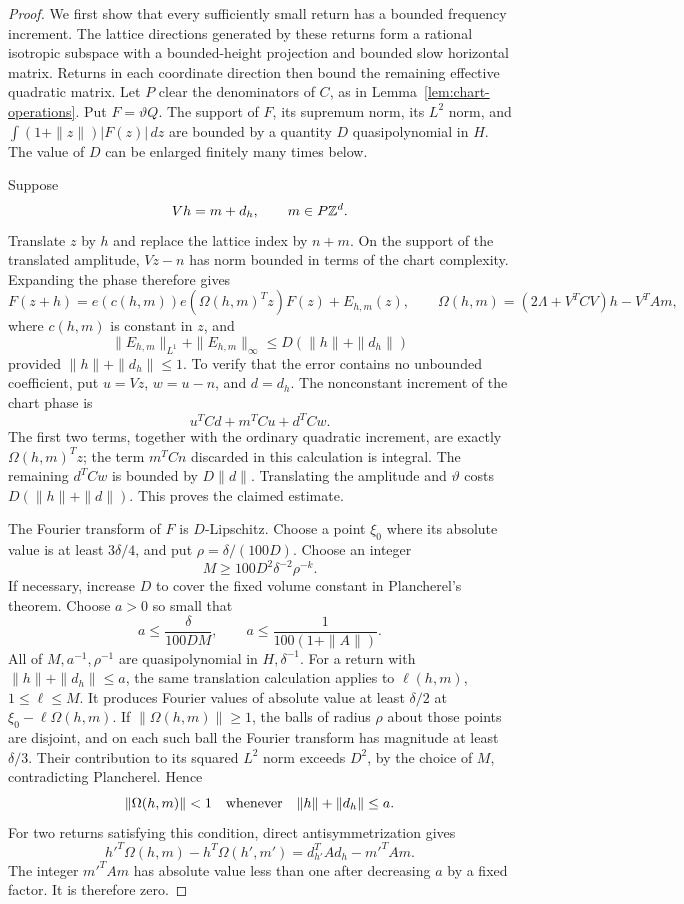 \begin{proof}
We first show that every sufficiently small return has a bounded
frequency increment.  The lattice directions generated by these returns
form a rational isotropic subspace with a bounded-height projection and
bounded slow horizontal matrix.  Returns in each coordinate direction
then bound the remaining effective quadratic matrix.
Let \(P\) clear the denominators of \(C\), as in
Lemma~\ref{lem:chart-operations}.  Put \(F=\vartheta Q\).
The support of \(F\), its supremum norm, its \(L^2\) norm, and
\(\int(1+\|z\|)|F(z)|\,dz\) are bounded by a quantity \(D\)
quasipolynomial in \(H\).
The value of \(D\) can be enlarged finitely many times below.

Suppose
\[
 Vh=m+d_h,\qquad m\in P\mathbb Z^d.
\]
Translate \(z\) by \(h\) and replace the lattice index by \(n+m\).
On the support of the translated amplitude, \(Vz-n\) has norm bounded
in terms of the chart complexity.  Expanding the phase therefore gives
\[
 F(z+h)=e(c(h,m))e(\Omega(h,m)^Tz)F(z)+E_{h,m}(z),
 \qquad
 \Omega(h,m)=(2\Lambda+V^TCV)h-V^TAm,
\]
where \(c(h,m)\) is constant in \(z\), and
\[
 \|E_{h,m}\|_{L^1}+\|E_{h,m}\|_\infty
       \le D(\|h\|+\|d_h\|)
\]
provided \(\|h\|+\|d_h\|\le1\).  To verify that the error contains no
unbounded coefficient, put \(u=Vz\), \(w=u-n\), and \(d=d_h\).
The nonconstant increment of the chart phase is
\[
 u^TCd+m^TCu+d^TCw.
\]
The first two terms, together with the ordinary quadratic increment,
are exactly \(\Omega(h,m)^Tz\); the term \(m^TCn\) discarded in this
calculation is integral.  The remaining \(d^TCw\) is bounded by
\(D\|d\|\).  Translating the amplitude and \(\vartheta\) costs
\(D(\|h\|+\|d\|)\).  This proves the claimed estimate.

The Fourier transform of \(F\) is \(D\)-Lipschitz.  Choose a point
\(\xi_0\) where its absolute value is at least \(3\delta/4\), and put
\(\rho=\delta/(100D)\).  Choose an integer
\[
 M\ge 100D^2\delta^{-2}\rho^{-k}.
\]
If necessary, increase \(D\) to cover the fixed volume constant in
Plancherel's theorem.  Choose \(a>0\) so small that
\[
 a\le\frac{\delta}{100DM},\qquad
 a\le\frac1{100(1+\|A\|)}.
\]
All of \(M,a^{-1},\rho^{-1}\) are quasipolynomial in \(H,\delta^{-1}\).
For a return with \(\|h\|+\|d_h\|\le a\), the same translation
calculation applies to \(\ell(h,m)\), \(1\le\ell\le M\).  It produces
Fourier values of absolute value at least \(\delta/2\) at
\(\xi_0-\ell\Omega(h,m)\).  If \(\|\Omega(h,m)\|\ge1\), the balls of
radius \(\rho\) about those points are disjoint, and on each such ball
the Fourier transform has magnitude at least \(\delta/3\).
Their contribution to its squared \(L^2\) norm exceeds \(D^2\), by the
choice of \(M\), contradicting Plancherel.  Hence
\[
 \|\Omega(h,m)\|<1
 \quad\hbox{whenever}\quad
 \|h\|+\|d_h\|\le a.
\]
For two returns satisfying this condition, direct antisymmetrization
gives
\[
 h'^T\Omega(h,m)-h^T\Omega(h',m')
       =d_{h'}^TAd_h-m'^TAm.
\]
The integer \(m'^TAm\) has absolute value less than one after decreasing
\(a\) by a fixed factor.  It is therefore zero.


\end{proof}

